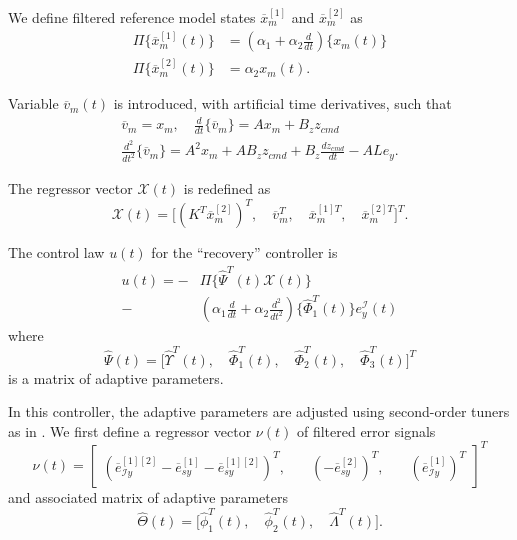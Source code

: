 \documentclass[english]{ifacconf}
\begin{document}
We define filtered reference model states $\overline{x}_m^{[1]}$ and $\overline{x}_m^{[2]}$ as
\begin{equation}
\begin{aligned}
	\Pi \big \{  \overline{x}_{m}^{[1]} (t) \big \} &= (\alpha_1 + \alpha_2 \frac{d}{dt}) \big \{ x_m (t) \big \} \\
	\Pi \big \{  \overline{x}_{m}^{[2]}(t) \big \} &= \alpha_2 x_m (t).
\end{aligned}	
\end{equation}

Variable $\overline{v}_m(t)$ is introduced, with artificial time derivatives, such that
\begin{equation}
\begin{gathered}
	\overline{v}_m = x_m, \quad \frac{d }{dt}\{ \overline{v}_m \} = A x_m + B_z z_{cmd} \\
	\frac{d^2}{dt^2} \{ \overline{v}_m \} = A^2 x_m + A B_z z_{cmd} + B_z \frac{dz_{cmd}}{dt} - A L e_y.
\end{gathered}
\end{equation}

The regressor vector $\mathcal{X}(t)$ is redefined as
\begin{equation}
\mathcal{X}(t) = \big[ (K^T \overline{x}_m^{[2]})^T,\quad \overline{v}_m^T,\quad \overline{x}_m^{[1]T},\quad \overline{x}_m^{[2]T} \big]^T.
\end{equation}

The control law $u(t)$ for the ``recovery'' controller is
\begin{equation}
\begin{aligned}
	u (t) = -&\Pi \big \{ \hat{\Psi}^T(t) \mathcal{X}(t) \big \} \\ - & (\alpha_1 \frac{d}{dt} + \alpha_2 \frac{d^2}{dt^2}) \big \{ \hat{\Phi}_1^T(t) \big \} e_y^\mathcal{I} (t) 
\end{aligned} \label{eq:u_rd3}
\end{equation}
where 
\begin{equation}
\hat{\Psi}(t) = \big[ \hat{\Upsilon}^T(t),\quad \hat{\Phi}_1^T(t),\quad \hat{\Phi}_2^T(t),\quad \hat{\Phi}_3^T(t) \big]^T 
\end{equation}
is a matrix of adaptive parameters. 

In this controller, the adaptive parameters are adjusted using second-order tuners as in \cite{qu2016phd}. We first define a regressor vector $\nu(t)$ of filtered error signals
\begin{equation}
	\nu(t) = \begin{bmatrix}
		(\overline{e}_{\mathcal{I}y}^{[1][2]} - \overline{e}_{sy}^{[1]} - \overline{e}_{sy}^{[1][2]})^T, & \quad (-\overline{e}_{sy}^{[2]})^T, & \quad (\overline{e}_{\mathcal{I}y}^{[1]})^T
	\end{bmatrix}^T
\end{equation}
and associated matrix of adaptive parameters
\begin{equation}
\hat{\Theta}(t) = \big[ \hat{\phi}_1^T(t),\quad \hat{\phi}_2^T(t),\quad \hat{\Lambda}^T(t) \big].
\end{equation}
\end{document}
